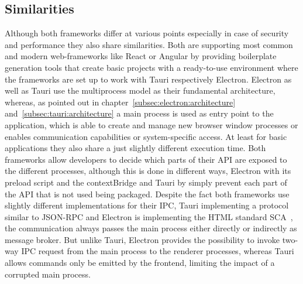 \subsection{Similarities}\label{subsec:similarities}
Although both frameworks differ at various points especially in case of security and performance they also share similarities.
Both are supporting most common and modern web-frameworks like React or Angular by providing boilerplate generation tools that create basic projects with a ready-to-use environment where the frameworks are set up to work with Tauri respectively Electron.
Electron as well as Tauri use the multiprocess model as their fundamental architecture, whereas, as pointed out in chapter~\ref{subsec:electron:architecture} and~\ref{subsec:tauri:architecture} a main process is used as entry point
to the application, which is able to create and manage new browser window processes or enables communication capabilities or system-specific access.
At least for basic applications they also share a just slightly different execution time.
Both frameworks allow developers to decide which parts of their \ac{API} are exposed to the different processes, although this is done in different ways, Electron with its preload script and the contextBridge and Tauri by simply prevent each part of the API that is not
used being packaged.
Despite the fact both frameworks use slightly different implementations for their \ac{IPC}, Tauri implementing a protocol similar to \ac{JSON-RPC} and Electron is implementing the \ac{HTML} standard \ac{SCA}~\cite{ElectronDoc},
the communication always passes the main process either directly or indirectly as message broker.
But unlike Tauri, Electron provides the possibility to invoke two-way \ac{IPC} request from the main process to the renderer processes, whereas Tauri allows commands only be emitted by the frontend, limiting the impact
of a corrupted main process.


